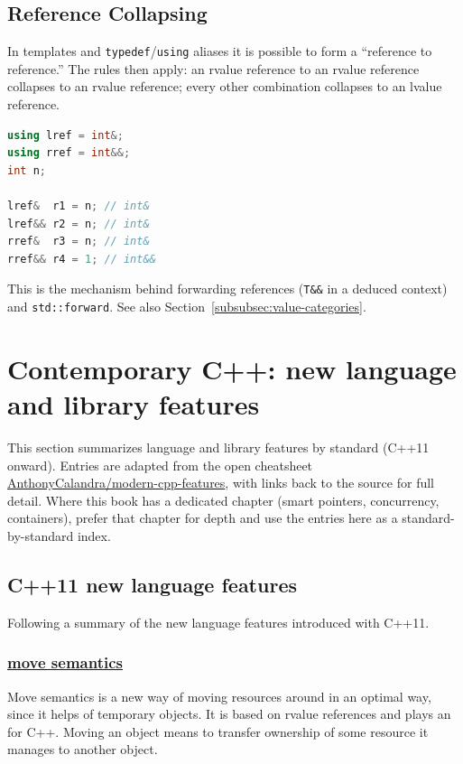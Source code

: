 \subsection{Reference Collapsing}
\label{subsubsec:reference-collapsing}
In templates and \texttt{typedef}/\texttt{using} aliases it is possible to form a 
``reference to reference.'' The  rules then apply: 
an rvalue reference to an rvalue reference collapses to an rvalue reference; 
every other combination collapses to an lvalue reference.
\begin{lstlisting}[language=C++]
using lref = int&;
using rref = int&&;
int n;

lref&  r1 = n; // int&
lref&& r2 = n; // int&
rref&  r3 = n; // int&
rref&& r4 = 1; // int&&
\end{lstlisting}
This is the mechanism behind forwarding references (\texttt{T\&\&} in a deduced context) 
and \texttt{std::forward}. See also Section~\ref{subsubsec:value-categories}.

\newpage
\section{Contemporary C++: new language and library features}
\label{sec:contemporary-cpp}
This section summarizes language and library features by standard (C++11 onward). 
Entries are adapted from the open cheatsheet 
\href{https://github.com/AnthonyCalandra/modern-cpp-features}{AnthonyCalandra/modern-cpp-features}, 
with links back to the source for full detail. 
Where this book has a dedicated chapter (smart pointers, concurrency, containers), 
prefer that chapter for depth and use the entries here as a standard-by-standard index.

\subsection{C++11 new language features}
Following a summary of the new language features introduced with C++11.

\subsubsection{\href{https://github.com/AnthonyCalandra/modern-cpp-features/tree/master\#move-semantics}
                    {move semantics}}
Move semantics is a new way of moving resources around in an optimal way, 
since it helps  of temporary objects. 
It is based on rvalue references and plays an  for C++.
\newline
Moving an object means to transfer ownership of some resource it manages 
to another object.

